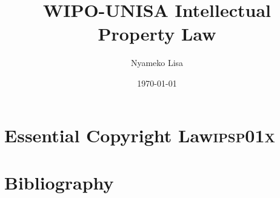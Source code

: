 \documentclass[11pt]{article}
\author{Nyameko Lisa}
\date{\today}
\title{WIPO-UNISA Intellectual Property Law}
\begin{document}
\maketitle
\tableofcontents


\section{Essential Copyright Law\hfill{}\textsc{ipsp01x}}
\label{sec:orge381ff5}
\cite{kogelnik66_laser_beams_reson} 


\section{Bibliography}
\label{sec:org4a15b7d}
%
\printbibliography
\end{document}
